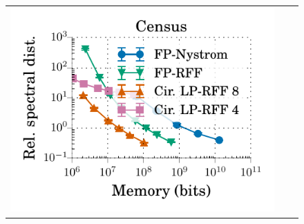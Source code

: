 \begin{figure}
	\centering
\begin{tabular}{@{\hskip -0.1in}c@{\hskip -0.1in}c@{\hskip -0.1in}c@{\hskip -0.1in}}
		\includegraphics[width=0.33\linewidth]{figures/regression_delta_vs_mem.pdf} &

\end{tabular}
\end{figure}
